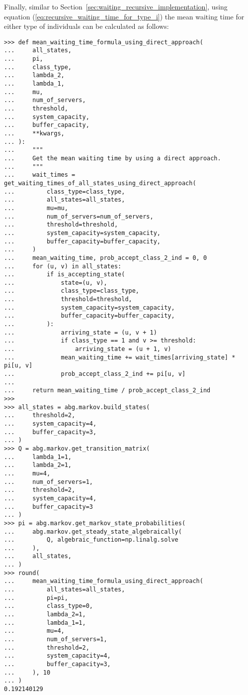 Finally, similar to Section~\ref{sec:waiting_recursive_implementation}, using
equation (\ref{eq:recursive_waiting_time_for_type_i}) the mean waiting time
for either type of individuals can be calculated as follows:

\begin{lstlisting}[style=pystyle] 
>>> def mean_waiting_time_formula_using_direct_approach(
...     all_states,
...     pi,
...     class_type,
...     lambda_2,
...     lambda_1,
...     mu,
...     num_of_servers,
...     threshold,
...     system_capacity,
...     buffer_capacity,
...     **kwargs,
... ):
...     """
...     Get the mean waiting time by using a direct approach.
...     """
...     wait_times = get_waiting_times_of_all_states_using_direct_approach(
...         class_type=class_type,
...         all_states=all_states,
...         mu=mu,
...         num_of_servers=num_of_servers,
...         threshold=threshold,
...         system_capacity=system_capacity,
...         buffer_capacity=buffer_capacity,
...     )
...     mean_waiting_time, prob_accept_class_2_ind = 0, 0
...     for (u, v) in all_states:
...         if is_accepting_state(
...             state=(u, v),
...             class_type=class_type,
...             threshold=threshold,
...             system_capacity=system_capacity,
...             buffer_capacity=buffer_capacity,
...         ):
...             arriving_state = (u, v + 1)
...             if class_type == 1 and v >= threshold:
...                 arriving_state = (u + 1, v)
...             mean_waiting_time += wait_times[arriving_state] * pi[u, v]
...             prob_accept_class_2_ind += pi[u, v]
... 
...     return mean_waiting_time / prob_accept_class_2_ind
>>>
>>> all_states = abg.markov.build_states(
...     threshold=2,
...     system_capacity=4,
...     buffer_capacity=3,
... )
>>> Q = abg.markov.get_transition_matrix(
...     lambda_1=1,
...     lambda_2=1,
...     mu=4,
...     num_of_servers=1,
...     threshold=2,
...     system_capacity=4,
...     buffer_capacity=3
... )
>>> pi = abg.markov.get_markov_state_probabilities(
...     abg.markov.get_steady_state_algebraically(
...         Q, algebraic_function=np.linalg.solve
...     ),
...     all_states,
... )
>>> round(
...     mean_waiting_time_formula_using_direct_approach(
...         all_states=all_states,
...         pi=pi,
...         class_type=0,
...         lambda_2=1,
...         lambda_1=1,
...         mu=4,
...         num_of_servers=1,
...         threshold=2,
...         system_capacity=4,
...         buffer_capacity=3,
...     ), 10
... )
0.192140129

\end{lstlisting}


